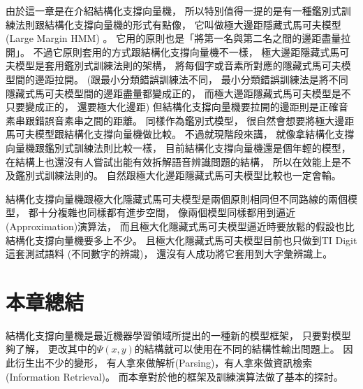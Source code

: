   由於這一章是在介紹結構化支撐向量機，
  所以特別值得一提的是有一種鑑別式訓練法則跟結構化支撐向量機的形式有點像，
  它叫做極大邊距隱藏式馬可夫模型(Large Margin HMM) \cite{LargeMarginHMM}。
  它用的原則也是「將第一名與第二名之間的邊距盡量拉開」。
  不過它原則套用的方式跟結構化支撐向量機不一樣，
  極大邊距隱藏式馬可夫模型是套用鑑別式訓練法則的架構，
  將每個字或音素所對應的隱藏式馬可夫模型間的邊距拉開。
  (跟最小分類錯誤訓練法不同，
  最小分類錯誤訓練法是將不同隱藏式馬可夫模型間的邊距盡量都變成正的，
  而極大邊距隱藏式馬可夫模型是不只要變成正的，
  還要極大化邊距)
  但結構化支撐向量機要拉開的邊距則是正確音素串跟錯誤音素串之間的距離。
  同樣作為鑑別式模型，
  很自然會想要將極大邊距馬可夫模型跟結構化支撐向量機做比較。
  不過就現階段來講，
  就像拿結構化支撐向量機跟鑑別式訓練法則比較一樣，
  目前結構化支撐向量機還是個年輕的模型，
  在結構上也還沒有人嘗試出能有效拆解語音辨識問題的結構，
  所以在效能上是不及鑑別式訓練法則的。
  自然跟極大化邊距隱藏式馬可夫模型比較也一定會輸。

  結構化支撐向量機跟極大化隱藏式馬可夫模型是兩個原則相同但不同路線的兩個模型，
  都十分複雜也同樣都有進步空間，
  像兩個模型同樣都用到逼近(Approximation)演算法，
  而且極大化隱藏式馬可夫模型逼近時要放鬆的假設也比結構化支撐向量機要多上不少。
  且極大化隱藏式馬可夫模型目前也只做到TI Digit這套測試語料
  (不同數字的辨識)，
  還沒有人成功將它套用到大字彙辨識上。

\section{本章總結}
  結構化支撐向量機是最近機器學習領域所提出的一種新的模型框架，
  只要對模型夠了解，
  更改其中的$\Psi(x,y)$的結構就可以使用在不同的結構性輸出問題上。
  因此衍生出不少的變形，
  有人拿來做解析(Parsing)，有人拿來做資訊檢索(Information Retrieval)。
  而本章對於他的框架及訓練演算法做了基本的探討。
